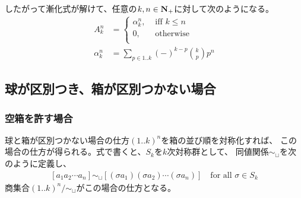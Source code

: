 	したがって漸化式が解けて、任意の$k,n\in{\mathbf{N}}_+$に対して次のようになる。
	\begin{equation}\label{eq:分配の大きさ}\begin{split} %
		A_k^n &= \begin{cases}
			\alpha_k^n, &\text{ iff }k\le n \\
			0, &\text{ otherwise } \\
		\end{cases} \\
		\alpha_k^n &= \sum_{p\in1..k}(-)^{k-p}\binom{k}{p}p^n
	\end{split}\end{equation} %
\subsection{球が区別つき、箱が区別つかない場合}\label{s2:球が区別つき、箱が区別つかない場合} %
\subsubsection{空箱を許す場合}\label{s3:空箱を許す場合} %
	球と箱が区別つかない場合の仕方$(1..k)^n$を箱の並び順を対称化すれば、
	この場合の仕方が得られる。式で書くと、$S_k$を$k$次対称群として、
	同値関係$\sim_\sqcup$を次のように定義し、
	\begin{equation*}\begin{split} %
		[a_1a_2\cdots a_n]
		\sim_\sqcup [(\sigma a_1)(\sigma a_2)\cdots(\sigma a_n)]
		\quad\text{for all }\sigma\in S_k
	\end{split}\end{equation*} %
	商集合$(1..k)^n/\sim_\sqcup$がこの場合の仕方となる。

